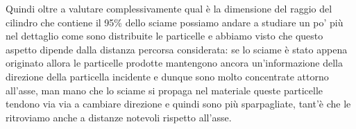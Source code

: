 Quindi oltre a valutare complessivamente qual è la dimensione del raggio del cilindro che contiene il 95\% dello sciame possiamo andare a studiare un po' più nel dettaglio come sono distribuite le particelle e abbiamo visto che questo aspetto dipende dalla distanza percorsa considerata: se lo sciame è stato appena originato allora le particelle prodotte mantengono ancora un'informazione della direzione della particella incidente e dunque sono molto concentrate attorno all'asse, man mano che lo sciame si propaga nel materiale queste particelle tendono via via a cambiare direzione e quindi sono più sparpagliate, tant'è che le ritroviamo anche a distanze notevoli rispetto all'asse.

